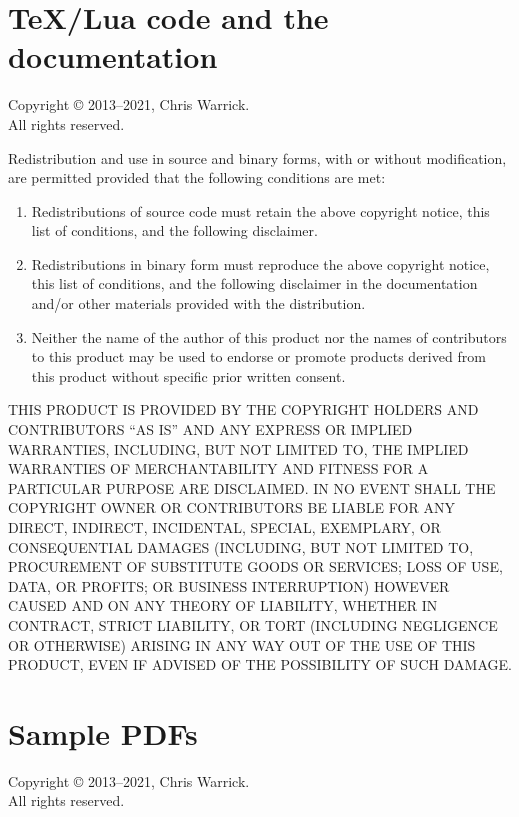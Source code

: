 \documentclass[a4paper,english]{report}
\numberwithin{equation}{section}
\newcommand{\staticyear}[0]{2021}
\begin{document}
\section{\TeX{}/Lua code and the documentation}

Copyright © 2013–\staticyear, Chris Warrick.  \\
All rights reserved.

Redistribution and use in source and binary forms, with or without
modification, are permitted provided that the following conditions are
met:

\begin{enumerate}
\item Redistributions of source code must retain the above copyright
   notice, this list of conditions, and the following disclaimer.

\item Redistributions in binary form must reproduce the above copyright
   notice, this list of conditions, and the following disclaimer in the
   documentation and/or other materials provided with the distribution.

\item Neither the name of the author of this product nor the names of
   contributors to this product may be used to endorse or promote
   products derived from this product without specific prior written
   consent.
\end{enumerate}

THIS PRODUCT IS PROVIDED BY THE COPYRIGHT HOLDERS AND CONTRIBUTORS
“AS IS” AND ANY EXPRESS OR IMPLIED WARRANTIES, INCLUDING, BUT NOT
LIMITED TO, THE IMPLIED WARRANTIES OF MERCHANTABILITY AND FITNESS FOR
A PARTICULAR PURPOSE ARE DISCLAIMED.  IN NO EVENT SHALL THE COPYRIGHT
OWNER OR CONTRIBUTORS BE LIABLE FOR ANY DIRECT, INDIRECT, INCIDENTAL,
SPECIAL, EXEMPLARY, OR CONSEQUENTIAL DAMAGES (INCLUDING, BUT NOT
LIMITED TO, PROCUREMENT OF SUBSTITUTE GOODS OR SERVICES; LOSS OF USE,
DATA, OR PROFITS; OR BUSINESS INTERRUPTION) HOWEVER CAUSED AND ON ANY
THEORY OF LIABILITY, WHETHER IN CONTRACT, STRICT LIABILITY, OR TORT
(INCLUDING NEGLIGENCE OR OTHERWISE) ARISING IN ANY WAY OUT OF THE USE
OF THIS PRODUCT, EVEN IF ADVISED OF THE POSSIBILITY OF SUCH DAMAGE.

\pagebreak

\section{Sample PDFs}

Copyright © 2013–\staticyear, Chris Warrick. \\
All rights reserved.
\end{document}
